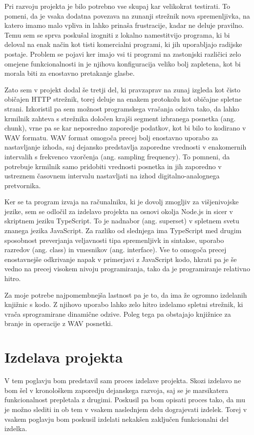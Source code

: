 \documentclass[12pt,a4paper,twoside,openright,slovene]{book}
\begin{document}
Pri razvoju projekta je bilo potrebno vse skupaj kar velikokrat testirati. To pomeni, da je vsaka dodatna povezava na zunanji strežnik nova spremenljivka, na katero imamo malo vpliva in lahko prinaša frustracije, kadar ne deluje pravilno. Temu sem se sprva poskušal izogniti z lokalno namestitvijo programa, ki bi deloval na enak način kot tisti komercialni programi, ki jih uporabljajo radijske postaje. Problem se pojavi ker imajo vsi ti programi na zastonjski različici zelo omejene funkcionalnosti in je njihova konfiguracija veliko bolj zapletena, kot bi morala biti za enostavno pretakanje glasbe.

Zato sem v projekt dodal še tretji del, ki pravzaprav na zunaj izgleda kot čisto običajen HTTP strežnik, torej deluje na enakem protokolu kot običajne spletne strani. Izkoristil pa sem možnost programskega vračanja odziva tako, da lahko krmilnik zahteva s strežnika določen krajši segment izbranega posnetka (ang. chunk), vrne pa se kar neposredno zaporedje podatkov, kot bi bilo to kodirano v WAV formatu. WAV format omogoča precej bolj enostavno uporabo za nastavljanje izhoda, saj dejansko predstavlja zaporedne vrednosti v enakomernih intervalih s frekvenco vzorčenja (ang. sampling frequency). To pomneni, da potrebuje krmilnik samo pridobiti vrednosti posnetka in jih zaporedno v ustreznem časovnem intervalu nastavljati na izhod digitalno-analognega pretvornika. 

Ker se ta program izvaja na računalniku, ki je dovolj zmogljiv za višjenivojske jezike, sem se odločil za izdelavo projekta na osnovi okolja Node.js in sicer v skriptnem jeziku TypeScript. To je nadnabor (ang. superset) v spletnem svetu znanega jezika JavaScript. Za razliko od slednjega ima TypeScript med drugim sposobnost preverjanja veljavnosti tipa spremenljivk in sintakse, uporabo razredov (ang. class) in vmesnikov (ang. interface). Vse to omogoča precej enostavnejše odkrivanje napak v primerjavi z JavaScript kodo, hkrati pa je še vedno na precej visokem nivoju programiranja, tako da je programiranje relativno hitro.

Za moje potrebe najpomembnejša lastnost pa je to, da ima že ogromno izdelanih knjižnic s kodo. Z njihovo uporabo lahko zelo hitro izdelamo spletni strežnik, ki vrača sprogramirane dinamične odzive. Poleg tega pa obstajajo knjižnice za branje in operacije z WAV posnetki.

\chapter{Izdelava projekta} \label{izdelava}
V tem poglavju bom predstavil sam proces izdelave projekta. Skozi izdelavo ne bom šel v kronološkem zaporedju dejanskega razvoja, saj se je marsikatera funkcionalnost prepletala z drugimi. Poskusil pa bom opisati proces tako, da mu je možno slediti in ob tem v vsakem naslednjem delu dograjevati izdelek. Torej v vsakem poglavju bom poskusil izdelati nekakšen zaključen funkcionalni del izdelka.
\end{document}
